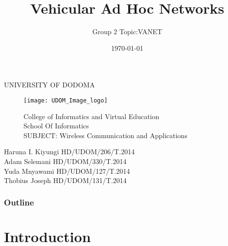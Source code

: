\documentclass{beamer}
\title[Short title]{Vehicular Ad Hoc Networks} %
\author{Group 2 Topic:VANET} %
\institute[UDOM] %
{
UNIVERSITY OF DODOMA\\ %
\medskip
}
\date{\today} %
\begin{document}
\begin{frame}
\begin{center}
	UNIVERSITY OF DODOMA\\
\end{center}
\begin{figure}
\centering
\texttt{[image: UDOM\_Image\_logo]}
\begin{center}
College of Informatics and Virtual Education\\
School Of Informatics\\
SUBJECT: Wireless Communication and Applications\\
\end{center}
\end{figure}

	\begin{center}
		Haruna I. Kiyungi HD/UDOM/206/T.2014\\
		Adam Selemani HD/UDOM/330/T.2014\\
		Yuda Mnyawami HD/UDOM/127/T.2014\\
		Thobius Joseph HD/UDOM/131/T.2014\\
	\end{center}

\end{frame}

\begin{frame}
\frametitle{Outline} %
\tableofcontents %
\end{frame}




\section{Introduction}
\end{document}
